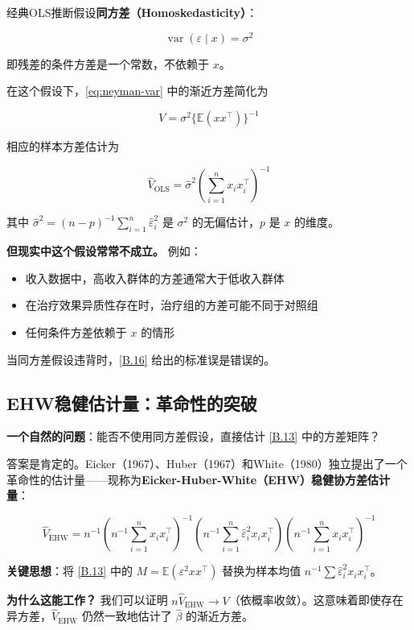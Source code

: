 经典OLS推断假设\textbf{同方差（Homoskedasticity）}：

\[
\operatorname{var}(\varepsilon \mid x) = \sigma^2
\tag{B.14}
\]

即残差的条件方差是一个常数，不依赖于 $x$。

在这个假设下，\cref{eq:neyman-var} 中的渐近方差简化为

\[
V = \sigma^2 \{ \mathbb{E}(x x^\top) \}^{-1}
\tag{B.15}
\]

相应的样本方差估计为

\[
\hat{V}_{\mathrm{OLS}} = \hat{\sigma}^2 \left(\sum_{i=1}^n x_i x_i^\top\right)^{-1}
\tag{B.16}
\]

其中 $\hat{\sigma}^2 = (n-p)^{-1}\sum_{i=1}^n \hat{\varepsilon}_i^2$ 是 $\sigma^2$ 的无偏估计，$p$ 是 $x$ 的维度。

\textbf{但现实中这个假设常常不成立。} 例如：
\begin{itemize}
  \item 收入数据中，高收入群体的方差通常大于低收入群体
  \item 在治疗效果异质性存在时，治疗组的方差可能不同于对照组
  \item 任何条件方差依赖于 $x$ 的情形
\end{itemize}

当同方差假设违背时，\cref{B.16} 给出的标准误是错误的。

\subsection{EHW稳健估计量：革命性的突破}\label{sec:B-ehw}

\textbf{一个自然的问题}：能否不使用同方差假设，直接估计 \cref{B.13} 中的方差矩阵？

答案是肯定的。Eicker（1967）、Huber（1967）和White（1980）独立提出了一个革命性的估计量——现称为\textbf{Eicker-Huber-White（EHW）稳健协方差估计量}：

\[
\hat{V}_{\mathrm{EHW}} = n^{-1} (n^{-1}\sum_{i=1}^n x_i x_i^\top)^{-1} (n^{-1}\sum_{i=1}^n \hat{\varepsilon}_i^2 x_i x_i^\top) (n^{-1}\sum_{i=1}^n x_i x_i^\top)^{-1}
\tag{B.17}
\]

\textbf{关键思想}：将 \cref{B.13} 中的 $M = \mathbb{E}(\varepsilon^2 x x^\top)$ 替换为样本均值 $n^{-1}\sum \hat{\varepsilon}_i^2 x_i x_i^\top$。

\textbf{为什么这能工作？} 我们可以证明 $n\hat{V}_{\mathrm{EHW}} \to V$（依概率收敛）。这意味着即使存在异方差，$\hat{V}_{\mathrm{EHW}}$ 仍然一致地估计了 $\hat{\beta}$ 的渐近方差。

